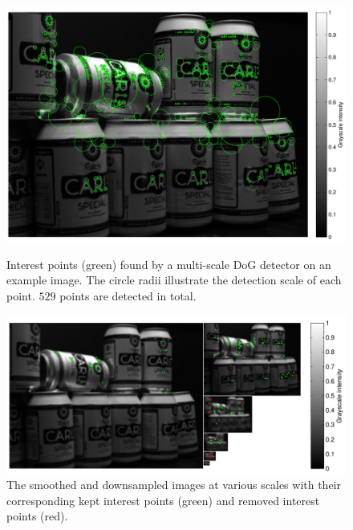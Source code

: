\documentclass[thesis.tex]{subfiles}
\begin{document}
\begin{figure}[p]
    \centering
    \includegraphics[width=\textwidth]{img/cellHistDetector.pdf}
    \caption{Interest points (green) found by a multi-scale DoG detector on an example image. The circle radii illustrate the detection scale of each point. $529$ points are detected in total.}
    \label{fig:cellHistDetector}
    \includegraphics[width=\textwidth]{img/cellHistScaleSpacesP.pdf}
    \caption{The smoothed and downsampled images at various scales with their corresponding kept interest points (green) and removed interest points (red).}
    \label{fig:cellHistScaleSpacesP}
\end{figure}
\end{document}
